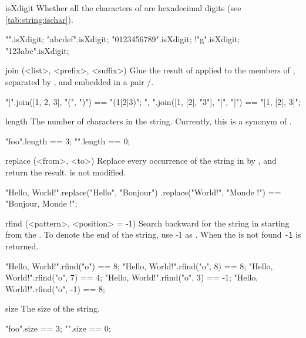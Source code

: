 \begin{urbiscriptapi}
\item[isXdigit] Whether all the characters of \this are hexadecimal digits
  (see \autoref{tab:string:ischar}).
\begin{urbiassert}
          "".isXdigit;
    "abcdef".isXdigit;
"0123456789".isXdigit;
        !"g".isXdigit; "123abc".isXdigit;
\end{urbiassert}


\item[join](<list>, <prefix>, <suffix>)%
  Glue the result of  applied to the members of
  , separated by \this, and embedded in a pair
  /.
\begin{urbiassert}
"|".join([1, 2, 3], "(", ")")      == "(1|2|3)";
", ".join([1, [2], "3"], "[", "]") == "[1, [2], 3]";
\end{urbiassert}


\item[length] The number of characters in the string.  Currently, this is a
  synonym of .
\begin{urbiassert}
"foo".length == 3;
   "".length == 0;
\end{urbiassert}


\item[replace](<from>, <to>)%
  Replace every occurrence of the string  in \this by ,
  and return the result.  \this is not modified.
\begin{urbiassert}
"Hello, World!".replace("Hello", "Bonjour")
                      .replace("World!", "Monde !") ==
       "Bonjour, Monde !";
\end{urbiassert}


\item[rfind](<pattern>, <position> = -1)%
  Search backward for the  string in \this starting from the
  .  To denote the end of the string, use -1 as
  .  When the  is not found \lstinline|-1| is
  returned.
\begin{urbiassert}
"Hello, World!".rfind("o")     == 8;
"Hello, World!".rfind("o", 8)  == 8;
"Hello, World!".rfind("o", 7)  == 4;
"Hello, World!".rfind("o", 3)  == -1;
"Hello, World!".rfind("o", -1) == 8;
\end{urbiassert}


\item[size]
  The size of the string.
\begin{urbiassert}
"foo".size == 3;
   "".size == 0;
\end{urbiassert}



\end{urbiscriptapi}
